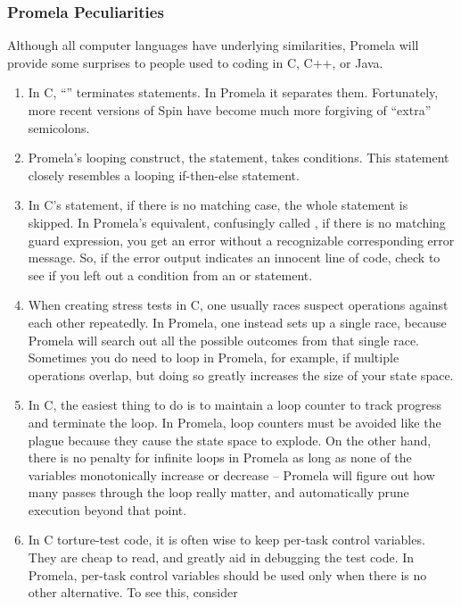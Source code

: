 \subsubsection{Promela Peculiarities}
\label{sec:formal:Promela Peculiarities}

Although all computer languages have underlying similarities,
Promela will provide some surprises to people used to coding in C,
C++, or Java.

\begin{enumerate}
\item	In C, ``\co{;}'' terminates statements.  In Promela it separates them.
	Fortunately, more recent versions of Spin have become
	much more forgiving of ``extra'' semicolons.
\item	Promela's looping construct, the  statement, takes
	conditions.
	This  statement closely resembles a looping if-then-else
	statement.
\item	In C's  statement, if there is no matching case, the whole
	statement is skipped.  In Promela's equivalent, confusingly called
	, if there is no matching guard expression, you get an error
	without a recognizable corresponding error message.
	So, if the error output indicates an innocent line of code,
	check to see if you left out a condition from an  or 
	statement.
\item	When creating stress tests in C, one usually races suspect operations
	against each other repeatedly.	In Promela, one instead sets up
	a single race, because Promela will search out all the possible
	outcomes from that single race.	Sometimes you do need to loop
	in Promela, for example, if multiple operations overlap, but
	doing so greatly increases the size of your state space.
\item	In C, the easiest thing to do is to maintain a loop counter to track
	progress and terminate the loop.  In Promela, loop counters
	must be avoided like the plague because they cause the state
	space to explode.  On the other hand, there is no penalty for
	infinite loops in Promela as long as none of the variables
	monotonically increase or decrease -- Promela will figure out
	how many passes through the loop really matter, and automatically
	prune execution beyond that point.
\item	In C torture-test code, it is often wise to keep per-task control
	variables.  They are cheap to read, and greatly aid in debugging the
	test code.  In Promela, per-task control variables should be used
	only when there is no other alternative.  To see this, consider

\end{enumerate}

